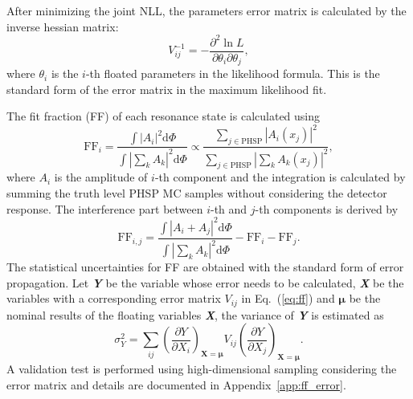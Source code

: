 After minimizing the joint NLL, the parameters error matrix is calculated by the inverse hessian matrix:
\begin{equation}\label{eq:ff}
    V_{ij}^{-1} = - \frac{\partial^2 \ln L}{\partial \theta_i \partial \theta_j},
\end{equation}
where $\theta_i$ is the $i$-th floated parameters in the likelihood formula. This is the standard form of the error matrix in the maximum likelihood fit.

The fit fraction (FF) of each resonance state is calculated using
\begin{equation} \label{eq:ff2}
    \mathrm{FF}_{i} = \frac{\int |A_i|^2\mathrm{d}\Phi}{\int |\sum_k A_k|^2\mathrm{d}\Phi} \varpropto \frac{\sum_{j\in\mathrm{PHSP}}|A_i(x_j)|^2}{\sum_{j\in\mathrm{PHSP}}|\sum_k A_k(x_j)|^2},
\end{equation}
where $A_i$ is the amplitude of $i$-th component and the integration is calculated by summing the truth level PHSP MC samples without considering the detector response. The interference part between $i$-th and $j$-th components is derived by
\begin{equation}\label{eq:ff3}
    \mathrm{FF}_{i,j} = \frac{\int |A_i + A_j|^2\mathrm{d}\Phi}{\int |\sum_k A_k|^2\mathrm{d}\Phi} - \mathrm{FF}_i - \mathrm{FF}_j.
\end{equation}
The statistical uncertainties for FF are obtained with the standard form of error propagation. Let \textbf{\emph{Y}} be the variable whose error needs to be calculated, \textbf{\emph{X}} be the variables with a corresponding error matrix $V_{ij}$ in Eq.~(\ref{eq:ff}) and $\boldsymbol{\mu}$ be the nominal results of the floating variables \textbf{\emph{X}}, the variance of \textbf{\emph{Y}} is estimated as
\begin{equation}
    \sigma_Y^2 = \sum_{ij}\left(\frac{\partial Y}{\partial X_i}\right)_{\boldsymbol{X} = \boldsymbol{\mu}} V_{ij}\left(\frac{\partial Y}{\partial X_j}\right)_{\boldsymbol{X}=\boldsymbol{\mu}}.
\end{equation}
A validation test is performed using high-dimensional sampling considering the error matrix and details are documented in Appendix~\ref{app:ff_error}.

